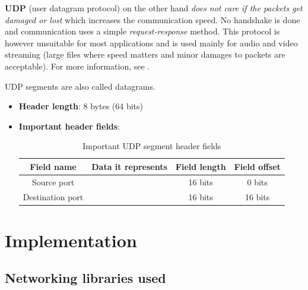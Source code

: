 \documentclass[a4paper]{article}
\begin{document}
  \textbf{UDP} (user datagram protocol) on the other hand 
  \textit{does not care if the packets get damaged or lost} which increases
  the communication speed. No handshake is done and communication uses a simple
  \textit{request-response} method. This protocol is however unsuitable for most 
  applications and is used mainly for audio and video streaming (large files
  where speed matters and minor damages to packets are acceptable).
  For more information, see \cite{wikipedia:udp}.
  \begin{notes}
    \item UDP segments are also called datagrams.
  \end{notes}

  \begin{itemize}
    \item \textbf{Header length}: 8 bytes (64 bits)
    \item \textbf{Important header fields}:
      \begin{table}[h]
        \centering
        \begin{tabular}{|c|c|c|c|}
          \hline
          Field name & Data it represents & Field length & Field offset \\
          \hline
          \hline
          Source port & & 16 bits & 0 bits \\
          \hline
          Destination port & & 16 bits & 16 bits \\
          \hline
        \end{tabular}
        \caption{Important UDP segment header fields}
      \end{table}
  \end{itemize}

  \newpage


  \section{Implementation}

  \subsection{Networking libraries used}
\end{document}

